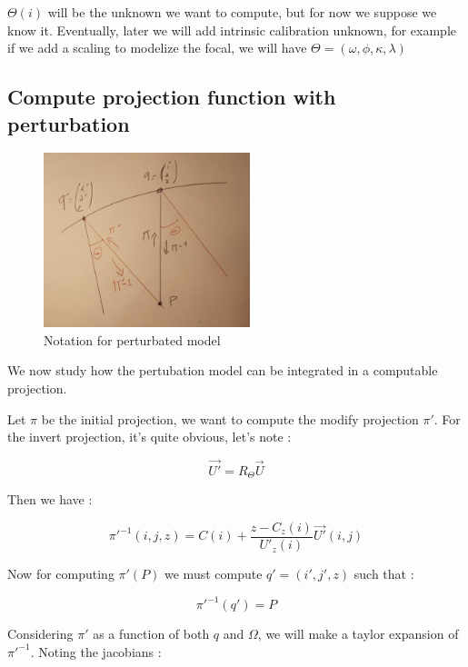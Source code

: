 $\Theta(i)$ will be the unknown we want to compute, but for now
we suppose we know it.  Eventually, later we will add intrinsic calibration
unknown, for example if we add a scaling to modelize the focal, we will 
have $\Theta=(\omega,\phi,\kappa, \lambda)$


\subsection{Compute projection function with perturbation}

\begin{figure}
\centering
\includegraphics[width=6cm]{Methods/Images/PushB2.jpg}\caption{Notation for perturbated model}
        \label{fig:PushB2}
\end{figure}

We now study how the pertubation model can be integrated in a
computable projection.

Let $\pi$ be the initial projection, we want to compute the modify
projection $\pi'$.
For the invert projection, it's quite obvious, let's note  :

\begin{equation}
    \vec{U'} =  R_\Theta \vec{U}
\end{equation}

Then we have :

\begin{equation}
	\pi'^{-1}(i,j,z) = C(i) + \frac{z-C_z(i)}{U'_z(i)} \vec{U'}(i,j)
\end{equation}


Now for computing $\pi'(P)$ we must compute $q'=(i',j',z)$ such that :

\begin{equation}
        \pi'^{-1}(q') = P
\end{equation}

Considering $\pi'$ as a function of both $q$ and $\Omega$,  we will make a taylor expansion 
of $\pi'^{-1}$. Noting  the jacobians :

